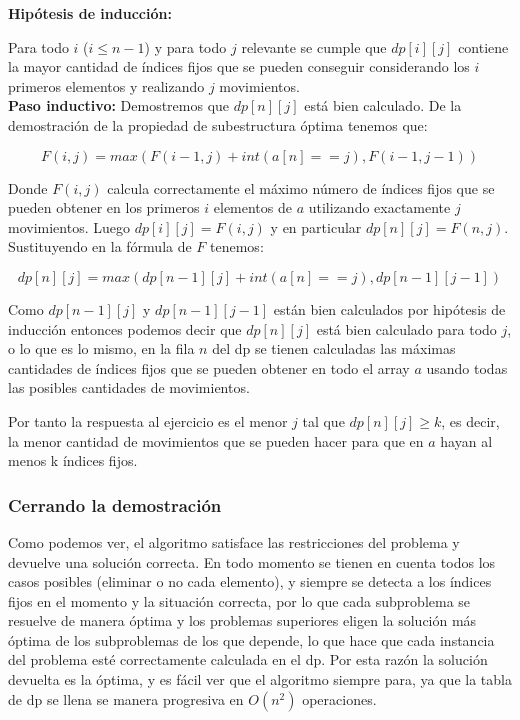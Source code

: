 \documentclass[11pt]{article}
\begin{document}
    \textbf{Hipótesis de inducción:}

    Para todo $i$ ($i \leq n-1$) y para todo $j$ relevante se cumple que $dp[i][j]$ contiene la mayor cantidad
    de índices fijos que se pueden conseguir considerando los $i$ primeros elementos y realizando $j$ movimientos.\\[10pt]

    \textbf{Paso inductivo:}
    Demostremos que $dp[n][j]$ está bien calculado. De la demostración de la propiedad de subestructura óptima
    tenemos que:

    \[
    F(i, j) = max(F(i-1, j) + int(a[n] == j), F(i-1, j-1))
    \]

    Donde $F(i, j)$ calcula correctamente el máximo número de índices fijos que se pueden obtener en los 
    primeros $i$ elementos de $a$ utilizando exactamente $j$ movimientos. Luego $dp[i][j] = F(i, j)$ y en 
    particular $dp[n][j] = F(n, j)$. Sustituyendo en la fórmula de $F$ tenemos:

    \[
    dp[n][j] = max(dp[n-1][j] + int(a[n] == j), dp[n-1][j-1])
    \]

    Como $dp[n-1][j]$ y $dp[n-1][j-1]$ están bien calculados por hipótesis de inducción entonces podemos
    decir que $dp[n][j]$ está bien calculado para todo $j$, o lo que es lo mismo, en la fila $n$ del dp se
    tienen calculadas las máximas cantidades de índices fijos que se pueden obtener en todo el array $a$ 
    usando todas las posibles cantidades de movimientos.

    Por tanto la respuesta al ejercicio es el menor $j$ tal que $dp[n][j] \geq k$, es decir, la menor cantidad
    de movimientos que se pueden hacer para que en $a$ hayan al menos k índices fijos.

    \subsubsection{Cerrando la demostración}
    Como podemos ver, el algoritmo satisface las restricciones del problema y devuelve una solución correcta.
    En todo momento se tienen en cuenta todos los casos posibles (eliminar o no cada elemento), y siempre se
    detecta a los índices fijos en el momento y la situación correcta, por lo que cada subproblema se resuelve
    de manera óptima y los problemas superiores eligen la solución más óptima de los subproblemas de los que
    depende, lo que hace que cada instancia del problema esté correctamente calculada en el dp. Por esta razón
    la solución devuelta es la óptima, y es fácil ver que el algoritmo siempre para, ya que la tabla de dp se
    llena se manera progresiva en $O(n^2)$ operaciones.
\end{document}

